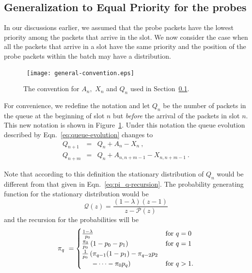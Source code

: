 \documentclass[11pt]{article}
\begin{document}
\subsection{Generalization to Equal Priority for the probes}
\label{sec:equal-priority}
In our discussions earlier, we assumed that the probe packets have the
lowest priority among the packets that arrive in the slot. We now
consider the case when all the packets that arrive in a slot have the
same priority and the position of the probe packets within the batch
may have a distribution.

\begin{figure}
  \begin{center}
    \ \texttt{[image: general-convention.eps]}
  \end{center}
  \caption{The convention for $A_n,$ $X_n$ and $Q_n$ used in
    Section~\ref{sec:equal-priority}. }
  \label{fig:general-convention}
\end{figure}

For convenience, we redefine the notation and let $Q_n$ be the number
of packets in the queue at the beginning of slot $n$ but \emph{before}
the arrival of the packets in slot $n$. This new notation is shown in
Figure~\ref{fig:general-convention}. Under this notation the queue
evolution described by Eqn.~\ref{eq:queue-evolution} changes to
\begin{eqnarray}
  Q_{n+1} &=& Q_n + A_{n} - X_{n} \ ,\nonumber \\
  Q_{n+m} &=& Q_n + A_{n,n+m-1} - X_{n,n+m-1} \ .
  \label{eq:general-queue-evolution}  
\end{eqnarray}

Note that according to this definition the stationary distribution of
$Q_n$ would be different from that given in
Eqn.~\ref{eq:pi_q-recursion}.  The probability generating function for
the stationary distribution would be
\begin{displaymath}
  \mathcal{Q}(z) = \frac{(1-\lambda)(z-1)}{z-\mathcal{P}(z)} 
\end{displaymath}
and the recursion for the probabilities will be
\begin{displaymath}
  \pi_q \ = 
  \begin{cases}
    \frac{1-\lambda}{p_0} & \mbox{for $q=0$} \\
    \frac{\pi_0}{p_0}\left(1-p_0 - p_1\right) & \mbox{for $q=1$} \\
    \frac{1}{p_0}\left( \pi_{q-1}(1-p_1) - \pi_{q-2} p_2 \right. & \\
      \hspace{0.2in}\left. - \cdots - \pi_0 p_{q} \right) & \mbox{for
        $q > 1$} . 
  \end{cases}
\end{displaymath}
\end{document}
